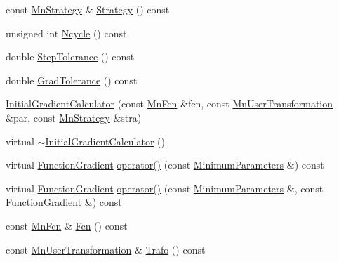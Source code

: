 \begin{DoxyCompactItemize}
\item 
const \mbox{\hyperlink{classROOT_1_1Minuit2_1_1MnStrategy}{Mn\+Strategy}} \& \mbox{\hyperlink{classROOT_1_1Minuit2_1_1InitialGradientCalculator_ac8fb719893c5d2959ba9d784c8c2e887}{Strategy}} () const
\item 
unsigned int \mbox{\hyperlink{classROOT_1_1Minuit2_1_1InitialGradientCalculator_aef8f53869854439865a45497e011a41c}{Ncycle}} () const
\item 
double \mbox{\hyperlink{classROOT_1_1Minuit2_1_1InitialGradientCalculator_afc3c2d01aedfca1ca5ba35d231f9916d}{Step\+Tolerance}} () const
\item 
double \mbox{\hyperlink{classROOT_1_1Minuit2_1_1InitialGradientCalculator_aac6cfb88ce499207d304fdaf404b4f7d}{Grad\+Tolerance}} () const
\item 
\mbox{\hyperlink{classROOT_1_1Minuit2_1_1InitialGradientCalculator_a25d1c68548c1ada8fa395a3c684a61ec}{Initial\+Gradient\+Calculator}} (const \mbox{\hyperlink{classROOT_1_1Minuit2_1_1MnFcn}{Mn\+Fcn}} \&fcn, const \mbox{\hyperlink{classROOT_1_1Minuit2_1_1MnUserTransformation}{Mn\+User\+Transformation}} \&par, const \mbox{\hyperlink{classROOT_1_1Minuit2_1_1MnStrategy}{Mn\+Strategy}} \&stra)
\item 
virtual \mbox{\hyperlink{classROOT_1_1Minuit2_1_1InitialGradientCalculator_a5d0dc43f0bc924799d29f6640aae863f}{$\sim$\+Initial\+Gradient\+Calculator}} ()
\item 
virtual \mbox{\hyperlink{classROOT_1_1Minuit2_1_1FunctionGradient}{Function\+Gradient}} \mbox{\hyperlink{classROOT_1_1Minuit2_1_1InitialGradientCalculator_ae3f248b2e9e40bc62ee7dc68c8ee010f}{operator()}} (const \mbox{\hyperlink{classROOT_1_1Minuit2_1_1MinimumParameters}{Minimum\+Parameters}} \&) const
\item 
virtual \mbox{\hyperlink{classROOT_1_1Minuit2_1_1FunctionGradient}{Function\+Gradient}} \mbox{\hyperlink{classROOT_1_1Minuit2_1_1InitialGradientCalculator_a673e891a98df0e4a4f71442ab61084bb}{operator()}} (const \mbox{\hyperlink{classROOT_1_1Minuit2_1_1MinimumParameters}{Minimum\+Parameters}} \&, const \mbox{\hyperlink{classROOT_1_1Minuit2_1_1FunctionGradient}{Function\+Gradient}} \&) const
\item 
const \mbox{\hyperlink{classROOT_1_1Minuit2_1_1MnFcn}{Mn\+Fcn}} \& \mbox{\hyperlink{classROOT_1_1Minuit2_1_1InitialGradientCalculator_ab8c917922374b40c93ba5821f31d72e9}{Fcn}} () const
\item 
const \mbox{\hyperlink{classROOT_1_1Minuit2_1_1MnUserTransformation}{Mn\+User\+Transformation}} \& \mbox{\hyperlink{classROOT_1_1Minuit2_1_1InitialGradientCalculator_aba7febb81b50fd961a9f7f754413a5c9}{Trafo}} () const

\end{DoxyCompactItemize}
